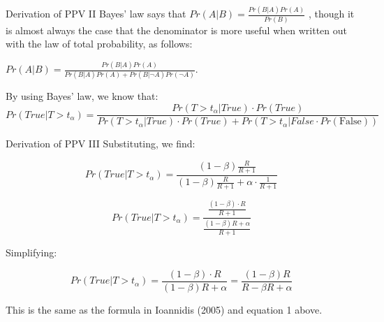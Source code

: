 \documentclass{beamer}
\begin{document}
\begin{frame}[label=derive]{Derivation of PPV II}
Bayes' law says that \(Pr(A|B) = \frac{Pr(B|A)Pr(A)}{Pr(B)}\) , though
it is almost always the case that the denominator is more useful when
written out with the law of total probability, as follows:

\(Pr(A|B) = \frac{Pr(B|A)Pr(A)}{Pr(B|A)Pr(A) + Pr(B|\neg A)Pr(\neg A)}\).

By using Bayes' law, we know that:
\tiny{
\[Pr(True|T > t_{\alpha}) = \frac{Pr(T > t_{\alpha}|True) \cdot Pr(True)}{Pr(T > t_{\alpha}|True) \cdot Pr(True) + Pr(T > t_{\alpha}|False \cdot Pr\left( \text{False} \right))}\]}
\end{frame}

\begin{frame}[label=derive]{Derivation of PPV III}
Substituting, we find:

\[Pr(True|T > t_{\alpha}) = \frac{(1 - \beta)\frac{R}{R + 1}}{(1 - \beta)\frac{R}{R + 1} + \alpha \cdot \frac{1}{R + 1}}\]

\[Pr(True|T > t_{\alpha}) = \frac{\frac{(1 - \beta) \cdot R}{R + 1}}{\frac{(1 - \beta)R + \alpha}{R + 1}}\]

Simplifying:

\[Pr(True|T > t_{\alpha}) = \frac{(1 - \beta) \cdot R}{(1 - \beta)R + \alpha} = \frac{(1 - \beta)R}{R - \beta R + \alpha}\]

This is the same as the formula in Ioannidis (2005) and equation 1
above.
\hyperlink{Ioannidis}{}
\end{frame}
\end{document}
